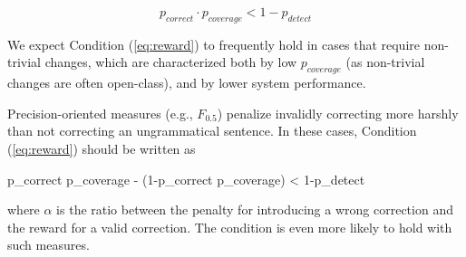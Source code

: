 \documentclass[11pt, a4paper]{article}
\newenvironment{myequation}{
  \vspace{-1em}
 \begin{equation}
}{
 \end{equation}
 \vspace{-1.2em}
}
\newenvironment{myequation*}{
	\vspace{-1em}
	\begin{equation*}
}{
\end{equation*}
\vspace{-1.2em}
}
\begin{document}
\vspace{.2cm}
\begin{small}
	\begin{myequation}
		\label{eq:reward}
		p_{correct} \cdot p_{coverage} < 1-p_{detect} 
	\end{myequation}
\end{small}


We expect Condition (\ref{eq:reward}) to frequently hold in cases that
require non-trivial changes, which are characterized both by low $p_{coverage}$ (as non-trivial
changes are often open-class), and by lower system performance.

Precision-oriented measures (e.g., $F_{0.5}$) penalize invalidly correcting more
harshly than not correcting an ungrammatical sentence.
In these cases, Condition (\ref{eq:reward}) should be written as

\begin{small}
	\begin{myequation*}
		p_{correct} \cdot p_{coverage} - \left(1-p_{correct} \cdot p_{coverage}\right) \alpha < 1-p_{detect} 
	\end{myequation*}
\end{small}

\noindent
where $\alpha$ is the ratio between the penalty for introducing a wrong correction and the reward for a valid correction. The condition is even more likely to hold with such measures.


\end{document}
